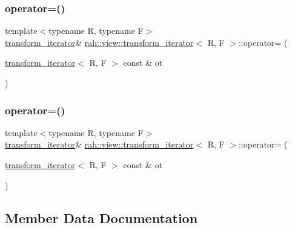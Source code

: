 \subsubsection{\texorpdfstring{operator=()}{operator=()}\hspace{0.1cm}{\footnotesize\ttfamily [1/2]}}
{\footnotesize\ttfamily template$<$typename R, typename F$>$ \\
\mbox{\hyperlink{structrah_1_1view_1_1transform__iterator}{transform\+\_\+iterator}}\& \mbox{\hyperlink{structrah_1_1view_1_1transform__iterator}{rah\+::view\+::transform\+\_\+iterator}}$<$ R, F $>$\+::operator= (\begin{DoxyParamCaption}\item[{\mbox{\hyperlink{structrah_1_1view_1_1transform__iterator}{transform\+\_\+iterator}}$<$ R, F $>$ const \&}]{ot }\end{DoxyParamCaption})\hspace{0.3cm}{\ttfamily [inline]}}

\mbox{\label{structrah_1_1view_1_1transform__iterator_a4589b5fff7d8505b8a569c9d1f863929}} 
\subsubsection{\texorpdfstring{operator=()}{operator=()}\hspace{0.1cm}{\footnotesize\ttfamily [2/2]}}
{\footnotesize\ttfamily template$<$typename R, typename F$>$ \\
\mbox{\hyperlink{structrah_1_1view_1_1transform__iterator}{transform\+\_\+iterator}}\& \mbox{\hyperlink{structrah_1_1view_1_1transform__iterator}{rah\+::view\+::transform\+\_\+iterator}}$<$ R, F $>$\+::operator= (\begin{DoxyParamCaption}\item[{\mbox{\hyperlink{structrah_1_1view_1_1transform__iterator}{transform\+\_\+iterator}}$<$ R, F $>$ const \&}]{ot }\end{DoxyParamCaption})\hspace{0.3cm}{\ttfamily [inline]}}



\subsection{Member Data Documentation}
\mbox{\label{structrah_1_1view_1_1transform__iterator_aaac20c3aa93a6ac347e8c26d8c892ea9}} 

